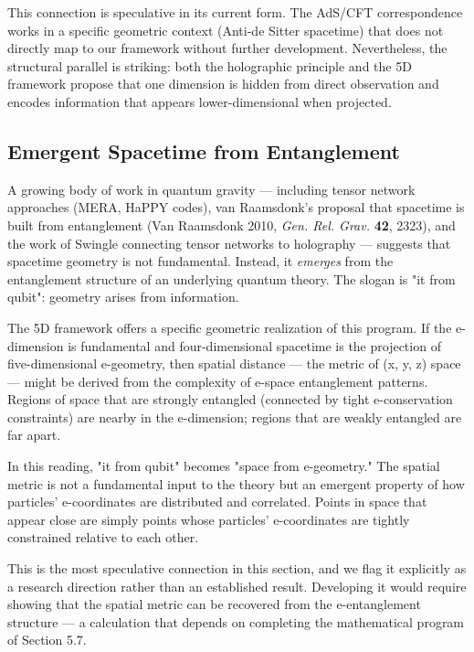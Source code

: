\documentclass[aps,prd,preprint,superscriptaddress,longbibliography,floatfix]{revtex4-2}
\theoremstyle{remark}
\begin{document}
This connection is speculative in its current form. The AdS/CFT correspondence works in a specific geometric context (Anti-de Sitter spacetime) that does not directly map to our framework without further development. Nevertheless, the structural parallel is striking: both the holographic principle and the 5D framework propose that one dimension is hidden from direct observation and encodes information that appears lower-dimensional when projected.



\subsection{Emergent Spacetime from Entanglement}

A growing body of work in quantum gravity --- including tensor network approaches (MERA, HaPPY codes), van Raamsdonk's proposal that spacetime is built from entanglement (Van Raamsdonk 2010, \textit{Gen. Rel. Grav.} \textbf{42}, 2323), and the work of Swingle connecting tensor networks to holography --- suggests that spacetime geometry is not fundamental. Instead, it \textit{emerges} from the entanglement structure of an underlying quantum theory. The slogan is "it from qubit": geometry arises from information.

The 5D framework offers a specific geometric realization of this program. If the e-dimension is fundamental and four-dimensional spacetime is the projection of five-dimensional e-geometry, then spatial distance --- the metric of (x, y, z) space --- might be derived from the complexity of e-space entanglement patterns. Regions of space that are strongly entangled (connected by tight e-conservation constraints) are nearby in the e-dimension; regions that are weakly entangled are far apart.

In this reading, "it from qubit" becomes "space from e-geometry." The spatial metric is not a fundamental input to the theory but an emergent property of how particles' e-coordinates are distributed and correlated. Points in space that appear close are simply points whose particles' e-coordinates are tightly constrained relative to each other.

This is the most speculative connection in this section, and we flag it explicitly as a research direction rather than an established result. Developing it would require showing that the spatial metric can be recovered from the e-entanglement structure --- a calculation that depends on completing the mathematical program of Section 5.7.
\end{document}
